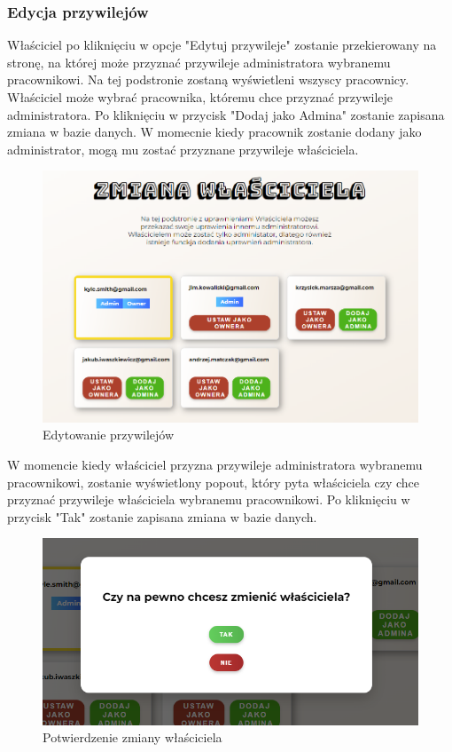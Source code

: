 \subsubsection{Edycja przywilejów}
\noindent Właściciel po kliknięciu w opcje "Edytuj przywileje" zostanie przekierowany na stronę,
na której może przyznać przywileje administratora wybranemu pracownikowi. Na tej podstronie zostaną 
wyświetleni wszyscy pracownicy. Właściciel może wybrać pracownika, któremu chce przyznać przywileje 
administratora. Po kliknięciu w przycisk "Dodaj jako Admina" zostanie zapisana zmiana w bazie danych.
W momecnie kiedy pracownik zostanie dodany jako administrator, mogą mu zostać przyznane przywileje właściciela.
\begin{figure}[h]
    \centering
    \includegraphics[scale=0.45]{photos/edytowanie_przywilejow.png}
    \caption{Edytowanie przywilejów}
    \label{fig:login}
\end{figure}
\newpage

\noindent W momencie kiedy właściciel przyzna przywileje administratora wybranemu pracownikowi, 
zostanie wyświetlony popout, który pyta właściciela czy chce przyznać przywileje właściciela wybranemu pracownikowi. Po 
kliknięciu w przycisk "Tak" zostanie zapisana zmiana w bazie danych.

\begin{figure}[h]
    \centering
    \includegraphics[scale=0.45]{photos/potwierdzenie.png}
    \caption{Potwierdzenie zmiany właściciela}
    \label{fig:login}
\end{figure}

